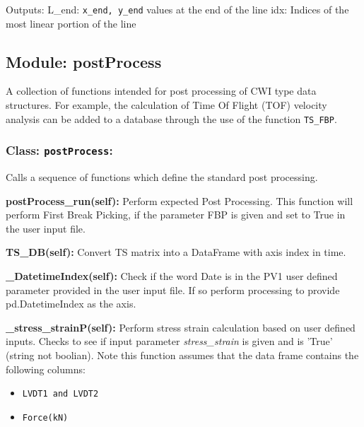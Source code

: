 \documentclass{article}
\begin{document}
        Outputs:\newline
        L\_end: \texttt{x\_end, y\_end} values at the end of the line\newline
        idx: Indices of the most linear portion of the line\newline

	\subsection{Module: postProcess} 
A collection of functions intended for post processing of CWI type data structures. For example, the calculation of Time Of Flight (TOF) velocity analysis can be added to a database through the use of the function \texttt{TS\_FBP}.
		\subsubsection{Class: \texttt{postProcess}:}
	Calls a sequence of functions which define the standard post processing. \newline
	
	\textbf{postProcess\_run(self):}
	Perform expected Post Processing. This function will perform First Break Picking, if the parameter FBP is given and set to True in the user input file.\newline
	
	\textbf{TS\_DB(self):}
	Convert TS matrix into a DataFrame with axis index in time.\newline
	
	\textbf{\_DatetimeIndex(self):}
	Check if the word Date is in the PV1 user defined parameter provided in the user input file. If so perform processing to provide pd.DatetimeIndex as the axis.\newline
	
	\textbf{\_stress\_strainP(self):}
	Perform stress strain calculation based on user defined inputs. Checks to see if input parameter \textit{stress\_strain} is given and is 'True' (string not boolian). Note this function assumes that the data frame contains the following columns:
	\begin{itemize}
		\item \texttt{LVDT1 and LVDT2}
		\item \texttt{Force(kN)}
	\end{itemize}
	
\end{document}
